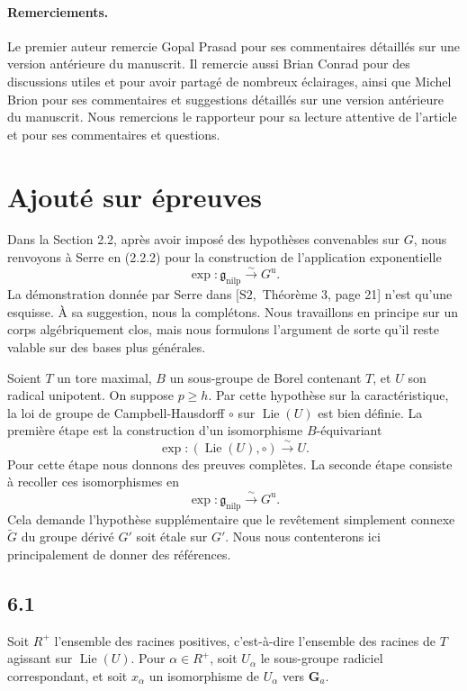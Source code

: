 \documentclass[11pt]{article}
\newcommand{\Ga}{\mathbf G_a}
\newcommand{\Lie}{\operatorname{Lie}}
\newcommand{\nilp}{\mathrm{nilp}}
\newcommand{\unip}{\mathrm u}
\begin{document}
\paragraph{Remerciements.}
Le premier auteur remercie Gopal Prasad pour ses commentaires détaillés sur une version
antérieure du manuscrit. Il remercie aussi Brian Conrad pour des discussions utiles et pour
avoir partagé de nombreux éclairages, ainsi que Michel Brion pour ses commentaires et
suggestions détaillés sur une version antérieure du manuscrit. Nous remercions le rapporteur
pour sa lecture attentive de l'article et pour ses commentaires et questions.

\section{Ajouté sur épreuves}

Dans la Section 2.2, après avoir imposé des hypothèses convenables sur \(G\), nous
renvoyons à Serre en (2.2.2) pour la construction de l'application exponentielle
\[
  \exp:\mathfrak g_{\nilp}\xrightarrow{\sim}G^{\unip}.
\]
La démonstration donnée par Serre dans \([\mathrm{S2},\) Théorème 3, page 21] n'est
qu'une esquisse. À sa suggestion, nous la complétons. Nous travaillons en principe sur un
corps algébriquement clos, mais nous formulons l'argument de sorte qu'il reste valable sur
des bases plus générales.

Soient \(T\) un tore maximal, \(B\) un sous-groupe de Borel contenant \(T\), et \(U\) son
radical unipotent. On suppose \(p\ge h\). Par cette hypothèse sur la caractéristique, la loi
de groupe de Campbell-Hausdorff \(\circ\) sur \(\Lie(U)\) est bien définie. La première étape
est la construction d'un isomorphisme \(B\)-équivariant
\begin{equation}
  \exp:(\Lie(U),\circ)\xrightarrow{\sim}U.
  \tag{6.0.1}
\end{equation}
Pour cette étape nous donnons des preuves complètes. La seconde étape consiste à recoller
ces isomorphismes en
\begin{equation}
  \exp:\mathfrak g_{\nilp}\xrightarrow{\sim}G^{\unip}.
  \tag{6.0.2}
\end{equation}
Cela demande l'hypothèse supplémentaire que le revêtement simplement connexe
\(\widetilde G\) du groupe dérivé \(G'\) soit étale sur \(G'\). Nous nous contenterons ici
principalement de donner des références.

\subsection*{6.1}
Soit \(R^+\) l'ensemble des racines positives, c'est-à-dire l'ensemble des racines de
\(T\) agissant sur \(\Lie(U)\). Pour \(\alpha\in R^+\), soit \(U_\alpha\) le sous-groupe
radiciel correspondant, et soit \(x_\alpha\) un isomorphisme de \(U_\alpha\) vers \(\Ga\).
\end{document}
